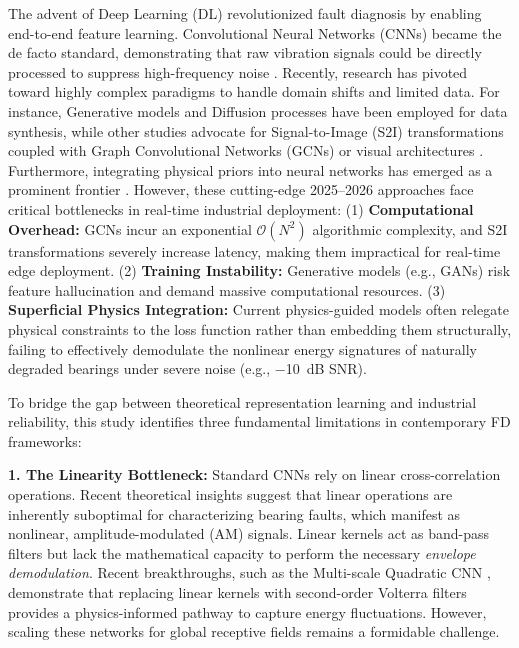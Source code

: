 \documentclass[5p,times,twocolumn]{elsarticle}
\begin{document}
The advent of Deep Learning (DL) revolutionized fault diagnosis by enabling end-to-end feature learning. Convolutional Neural Networks (CNNs) became the de facto standard, demonstrating that raw vibration signals could be directly processed to suppress high-frequency noise \cite{P21_Zhang, P20_Zhao}. Recently, research has pivoted toward highly complex paradigms to handle domain shifts and limited data. For instance, Generative models and Diffusion processes \cite{Ref_Guo_DiffUCD, Ref_Zhang_GAN} have been employed for data synthesis, while other studies advocate for Signal-to-Image (S2I) transformations coupled with Graph Convolutional Networks (GCNs) or visual architectures \cite{Ref_Li_ESC_DGCN, Asyari_NREL_2025}. Furthermore, integrating physical priors into neural networks has emerged as a prominent frontier \cite{Ref_Wu_TIM_2026, Ref_Liu_AEI_2025}. However, these cutting-edge 2025--2026 approaches face critical bottlenecks in real-time industrial deployment: 
(1) \textbf{Computational Overhead:} GCNs incur an exponential $\mathcal{O}(N^2)$ algorithmic complexity, and S2I transformations severely increase latency, making them impractical for real-time edge deployment. 
(2) \textbf{Training Instability:} Generative models (e.g., GANs) risk feature hallucination and demand massive computational resources. 
(3) \textbf{Superficial Physics Integration:} Current physics-guided models often relegate physical constraints to the loss function rather than embedding them structurally, failing to effectively demodulate the nonlinear energy signatures of naturally degraded bearings under severe noise (e.g., \SI{-10}{dB} SNR).

To bridge the gap between theoretical representation learning and industrial reliability, this study identifies three fundamental limitations in contemporary FD frameworks:

\textbf{1. The Linearity Bottleneck:} Standard CNNs rely on linear cross-correlation operations. Recent theoretical insights \cite{P36_Fan, P41_Xu} suggest that linear operations are inherently suboptimal for characterizing bearing faults, which manifest as nonlinear, amplitude-modulated (AM) signals. Linear kernels act as band-pass filters but lack the mathematical capacity to perform the necessary \textit{envelope demodulation}. Recent breakthroughs, such as the Multi-scale Quadratic CNN \cite{Ref_Ji_MDQCNN}, demonstrate that replacing linear kernels with second-order Volterra filters provides a physics-informed pathway to capture energy fluctuations. However, scaling these networks for global receptive fields remains a formidable challenge. 
\end{document}
